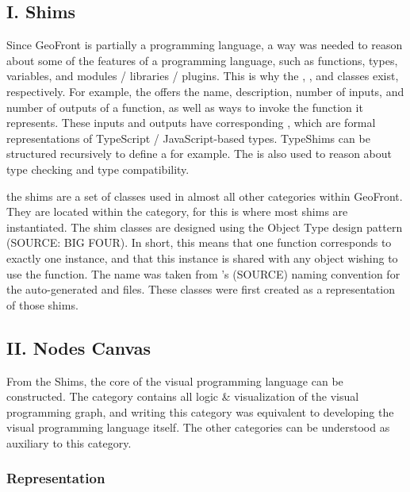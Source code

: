 \subsection*{I. Shims}

Since GeoFront is partially a programming language, a way was needed to reason about some of the features of a programming language, such as functions, types, variables, and modules / libraries / plugins. 
This is why the , ,  and  classes exist, respectively. 
For example, the  offers the name, description, number of inputs, and number of outputs of a function, as well as ways to invoke the function it represents.
These inputs and outputs have corresponding , which are formal representations of TypeScript / JavaScript-based types. TypeShims can be structured recursively to define a  for example. The  is also used to reason about type checking and type compatibility.

the shims are a set of classes used in almost all other categories within GeoFront. They are located within the  category, for this is where most shims are instantiated.
The shim classes are designed using the Object Type design pattern (SOURCE: BIG FOUR). In short, this means that one function corresponds to exactly one  instance, and that this instance is shared with any object wishing to use the function. 
The name  was taken from 's (SOURCE) naming convention for the auto-generated  and  files. These classes were first created as a representation of those shims.


\subsection*{II. Nodes Canvas}
From the Shims, the core of the visual programming language can be constructed. The  category contains all logic \& visualization of the visual programming graph, and writing this category was equivalent to developing the visual programming language itself. The other categories can be understood as auxiliary to this category.

\subsubsection*{ Representation }

